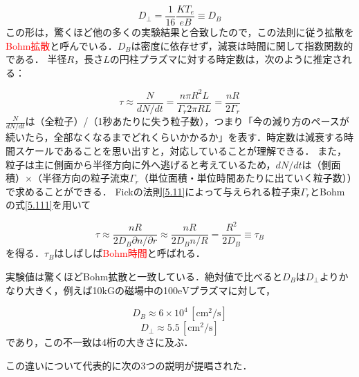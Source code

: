 \documentclass{ltjsarticle}
\numberwithin{equation}{section} %
\begin{document}
\begin{equation}
  D_\perp = \frac{1}{16}\frac{KT_e}{eB} \equiv D_B \label{5.111}
\end{equation}
この形は，驚くほど他の多くの実験結果と合致したので，この法則に従う拡散を\textcolor{red}{Bohm拡散}と呼んでいる．$D_B$は密度に依存せず，減衰は時間に関して指数関数的である．
半径$R$，長さ$L$の円柱プラズマに対する時定数は，次のように推定される：

\[
  \tau \approx \frac{N}{dN/dt} = \frac{n\pi R^2L}{\Gamma_r2\pi RL} = \frac{nR}{2\Gamma_r}
\]
$\frac{N}{dN/dt}$は（全粒子）/（1秒あたりに失う粒子数），つまり「今の減り方のペースが続いたら，全部なくなるまでどれくらいかかるか」を表す．時定数は減衰する時間スケールであることを思い出すと，対応していることが理解できる．
また，粒子は主に側面から半径方向に外へ逃げると考えているため，$dN/dt$は（側面積）$\times$（半径方向の粒子流束$\Gamma_r$（単位面積・単位時間あたりに出ていく粒子数））で求めることができる．
Fickの法則\eqref{5.11}によって与えられる粒子束$\Gamma_r$とBohmの式\eqref{5.111}を用いて

\begin{equation}
  \tau \approx \frac{nR}{2D_B \partial n/\partial r} \approx \frac{nR}{2D_Bn/R} = \frac{R^2}{2D_B} \equiv \tau_B \label{5.112}
\end{equation}
を得る．$\tau_B$はしばしば\textcolor{red}{Bohm時間}と呼ばれる．

実験値は驚くほどBohm拡散と一致している．絶対値で比べると$D_B$は$D_\perp$よりかなり大きく，例えば10$\mathrm{kG}$の磁場中の100$\mathrm{eV}$プラズマに対して，

\[
  D_B \approx 6\times 10^4\,[\mathrm{cm^2/s}]
\]
\[
  D_\perp \approx 5.5\,[\mathrm{cm^2/s}]
\]
であり，この不一致は4桁の大きさに及ぶ．

この違いについて代表的に次の3つの説明が提唱された．
\end{document}
